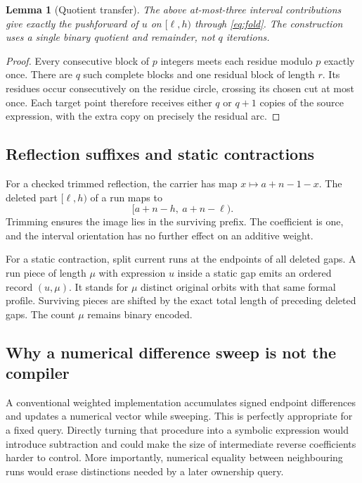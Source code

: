 \documentclass[11pt]{article}
\newtheorem{lemma}[theorem]{Lemma}
\theoremstyle{definition}\newtheorem{definition}[theorem]{Definition}
\theoremstyle{remark}\newtheorem{remark}[theorem]{Remark}
\begin{document}
\begin{lemma}[Quotient transfer]
The above at-most-three interval contributions give exactly the pushforward of
$u$ on $[\ell,h)$ through \eqref{eq:fold}. The construction uses a single binary
quotient and remainder, not $q$ iterations.
\end{lemma}
\begin{proof}
Every consecutive block of $p$ integers meets each residue modulo $p$ exactly
once. There are $q$ such complete blocks and one residual block of length $r$.
Its residues occur consecutively on the residue circle, crossing its chosen cut
at most once. Each target point therefore receives either $q$ or $q+1$ copies
of the source expression, with the extra copy on precisely the residual arc.
\end{proof}

\subsection{Reflection suffixes and static contractions}
For a checked trimmed reflection, the carrier has map $x\mapsto a+n-1-x$.
The deleted part $[\ell,h)$ of a run maps to
\begin{equation}
 [a+n-h,\ a+n-\ell).
 \label{eq:reflection}
\end{equation}
Trimming ensures the image lies in the surviving prefix. The coefficient is
one, and the interval orientation has no further effect on an additive weight.

For a static contraction, split current runs at the endpoints of all deleted
gaps. A run piece of length $\mu$ with expression $u$ inside a static gap emits
an ordered record $(u,\mu)$. It stands for $\mu$ distinct original orbits with
that same formal profile. Surviving pieces are shifted by the exact total length
of preceding deleted gaps. The count $\mu$ remains binary encoded.

\subsection{Why a numerical difference sweep is not the compiler}
A conventional weighted implementation accumulates signed endpoint differences
and updates a numerical vector while sweeping. This is perfectly appropriate
for a fixed query. Directly turning that procedure into a symbolic expression
would introduce subtraction and could make the size of intermediate reverse
coefficients harder to control. More importantly, numerical equality between
neighbouring runs would erase distinctions needed by a later ownership query.
\end{document}
